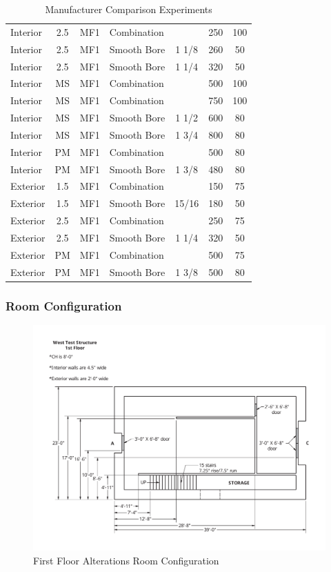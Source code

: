 \documentclass{article}
\begin{document}
\begin{table}[]
\begin{tabular}{|lcclccc|}
Interior & 2.5 & MF1 & Combination &  & 250 & 100 \\
Interior & 2.5 & MF1 & Smooth Bore & 1 1/8 & 260 & 50 \\
Interior & 2.5 & MF1 & Smooth Bore & 1 1/4 & 320 & 50 \\
Interior & MS & MF1 & Combination &  & 500 & 100 \\
Interior & MS & MF1 & Combination &  & 750 & 100 \\
Interior & MS & MF1 & Smooth Bore & 1 1/2 & 600 & 80 \\
Interior & MS & MF1 & Smooth Bore & 1 3/4 & 800 & 80 \\
Interior & PM & MF1 & Combination &  & 500 & 80 \\
Interior & PM & MF1 & Smooth Bore & 1 3/8 & 480 & 80 \\
Exterior & 1.5 & MF1 & Combination &  & 150 & 75 \\
Exterior & 1.5 & MF1 & Smooth Bore & 15/16 & 180 & 50 \\
Exterior & 2.5 & MF1 & Combination &  & 250 & 75 \\
Exterior & 2.5 & MF1 & Smooth Bore & 1 1/4 & 320 & 50 \\
Exterior & PM & MF1 & Combination &  & 500 & 75 \\
Exterior & PM & MF1 & Smooth Bore & 1 3/8 & 500 & 80 \\ \hline
\end{tabular}
\caption{Manufacturer Comparison Experiments}
\label{Manufacturer_Comparison_Experiments}
\end{table}

\subsubsection{Room Configuration}

\begin{figure}[!ht]
	\centering
	\includegraphics[width=5in]{Figures/Air_Entrainment/West_Test_Structure_1st_Floor_nodim.pdf}
	\caption{First Floor Alterations Room Configuration}
	\label{fig:First_Floor_Alterations_Room_Configuration}
\end{figure}
\end{document}
